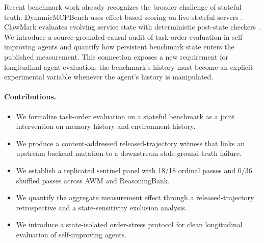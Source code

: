 Recent benchmark work already recognizes the broader challenge of stateful truth. DynamicMCPBench uses effect-based scoring on live stateful servers \citep{kaminski2026dynamicmcpbench}. ClawMark evaluates evolving service state with deterministic post-state checkers \citep{meng2026clawmark}. We introduce a source-grounded causal audit of task-order evaluation in self-improving agents and quantify how persistent benchmark state enters the published measurement. This connection exposes a new requirement for longitudinal agent evaluation: the benchmark's history must become an explicit experimental variable whenever the agent's history is manipulated.

\paragraph{Contributions.}
\begin{itemize}
    \item We formalize task-order evaluation on a stateful benchmark as a joint intervention on memory history and environment history.
    \item We produce a content-addressed released-trajectory witness that links an upstream backend mutation to a downstream stale-ground-truth failure.
    \item We establish a replicated sentinel panel with 18/18 ordinal passes and 0/36 shuffled passes across AWM and ReasoningBank.
    \item We quantify the aggregate measurement effect through a released-trajectory retrospective and a state-sensitivity exclusion analysis.
    \item We introduce a state-isolated order-stress protocol for clean longitudinal evaluation of self-improving agents.
\end{itemize}
